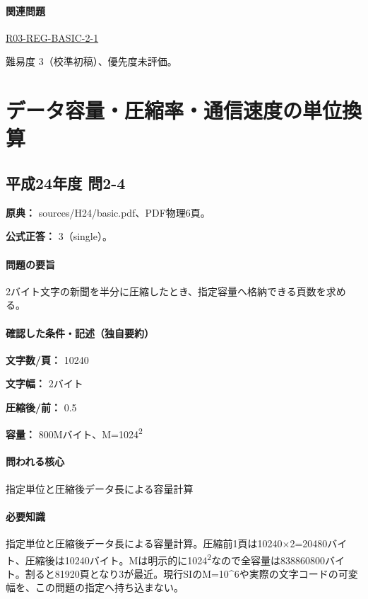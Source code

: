 \paragraph{関連問題} \hyperref[q:r03-reg-basic-2-1]{R03-REG-BASIC-2-1}

\par 難易度 3（校準初稿）、優先度未評価。

\section{データ容量・圧縮率・通信速度の単位換算}

\subsection{平成24年度 問2-4}
\label{q:h24-reg-basic-2-4}

\noindent\textbf{原典：} sources/H24/basic.pdf、PDF物理6頁。

\textbf{公式正答：} 3（single）。

\paragraph{問題の要旨} 2バイト文字の新聞を半分に圧縮したとき、指定容量へ格納できる頁数を求める。

\paragraph{確認した条件・記述（独自要約）}\mbox{}\par

\noindent\textbf{文字数/頁：} 10240\par

\noindent\textbf{文字幅：} 2バイト\par

\noindent\textbf{圧縮後/前：} 0.5\par

\noindent\textbf{容量：} 800Mバイト、M=\allowbreak{}1024\textsuperscript{2}\par

\paragraph{問われる核心} 指定単位と圧縮後データ長による容量計算

\paragraph{必要知識} 指定単位と圧縮後データ長による容量計算。圧縮前1頁は10240×2=\allowbreak{}20480バイト、圧縮後は10240バイト。Mは明示的に1024\textsuperscript{2}なので全容量は838860800バイト。割ると81920頁となり3が最近。現行SIのM=\allowbreak{}10\textasciicircum{}6や実際の文字コードの可変幅を、この問題の指定へ持ち込まない。

